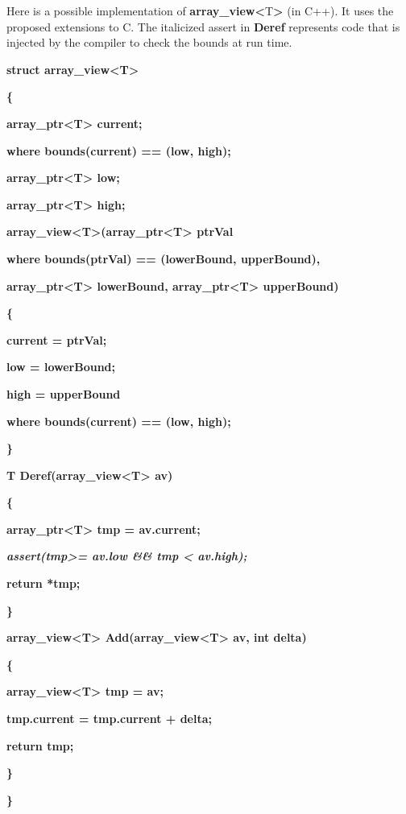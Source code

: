 \documentclass[]{article}
\begin{document}
Here is a possible implementation of
\textbf{array\_view\textless{}}T\textbf{\textgreater{}} (in C++). It
uses the proposed extensions to C. The italicized assert in
\textbf{Deref} represents code that is injected by the compiler to check
the bounds at run time.

\textbf{struct array\_view\textless{}T\textgreater{}}

\textbf{\{}

\textbf{array\_ptr\textless{}T\textgreater{} current;}

\textbf{where bounds(current) == (low, high);}

\textbf{array\_ptr\textless{}T\textgreater{} low;}

\textbf{array\_ptr\textless{}T\textgreater{} high;}

\textbf{array\_view\textless{}T\textgreater{}(array\_ptr\textless{}T\textgreater{}
ptrVal }

\textbf{where bounds(ptrVal) == (lowerBound, upperBound),}

\textbf{array\_ptr\textless{}T\textgreater{} lowerBound,
array\_ptr\textless{}T\textgreater{} upperBound)}

\textbf{\{}

\textbf{current = ptrVal;}

\textbf{low = lowerBound;}

\textbf{high = upperBound}

\textbf{where bounds(current) == (low, high);}

\textbf{\}}

\textbf{T Deref(array\_view\textless{}T\textgreater{} av) }

\textbf{\{}

\textbf{array\_ptr\textless{}T\textgreater{} tmp = av.current;}

\emph{\textbf{assert(tmp\textgreater{}= av.low \&\& tmp \textless{}
av.high);}}

\textbf{return *tmp;}

\textbf{\}}

\textbf{array\_view\textless{}T\textgreater{}
Add(array\_view\textless{}T\textgreater{} av, int delta) }

\textbf{\{}

\textbf{array\_view\textless{}T\textgreater{} tmp = av;}

\textbf{tmp.current = tmp.current + delta;}

\textbf{return tmp;}

\textbf{\}}

\textbf{\}}
\end{document}

